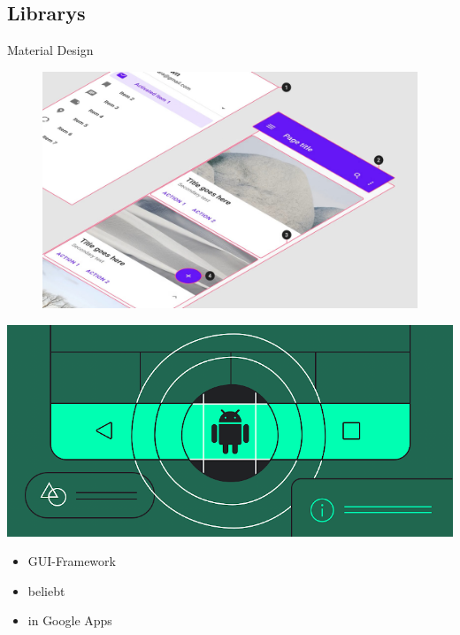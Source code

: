 \documentclass[aspectratio=169]{beamer}
\begin{document}
\subsection{Librarys}
\begin{frame}[plain]{Material Design}
\begin{varwidth}{.5\textwidth}
        \begin{figure}
            \centering
            \includegraphics[width=\textwidth]{media/material-design-in-action.jpg}
        \end{figure}
    \end{varwidth}
    \hfill
    \begin{varwidth}{.4\textwidth}
        \includegraphics[width=\textwidth]{media/material-android.png}
        \begin{itemize}\pause
            \item GUI-Framework\pause
            \item beliebt\pause
            \item in Google Apps
        \end{itemize}
    \end{varwidth}
\end{frame}
\end{document}
